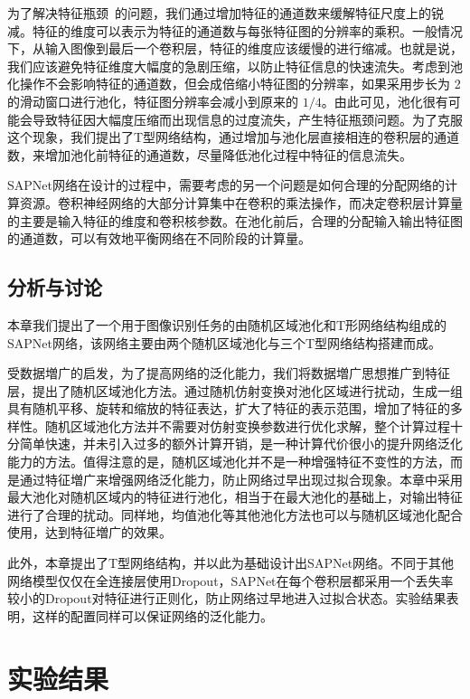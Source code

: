 为了解决特征瓶颈~\cite{szegedy2015rethinking}的问题，我们通过增加特征的通道数来缓解特征尺度上的锐减。特征的维度可以表示为特征的通道数与每张特征图的分辨率的乘积。一般情况下，从输入图像到最后一个卷积层，特征的维度应该缓慢的进行缩减。也就是说，我们应该避免特征维度大幅度的急剧压缩，以防止特征信息的快速流失。考虑到池化操作不会影响特征的通道数，但会成倍缩小特征图的分辨率，如果采用步长为 2 的滑动窗口进行池化，特征图分辨率会减小到原来的 $1/4$。由此可见，池化很有可能会导致特征因大幅度压缩而出现信息的过度流失，产生特征瓶颈问题。为了克服这个现象，我们提出了T型网络结构，通过增加与池化层直接相连的卷积层的通道数，来增加池化前特征的通道数，尽量降低池化过程中特征的信息流失。

SAPNet网络在设计的过程中，需要考虑的另一个问题是如何合理的分配网络的计算资源。卷积神经网络的大部分计算集中在卷积的乘法操作，而决定卷积层计算量的主要是输入特征的维度和卷积核参数。在池化前后，合理的分配输入输出特征图的通道数，可以有效地平衡网络在不同阶段的计算量。

\subsection{分析与讨论}
\label{sec:sap:model:discuss}

本章我们提出了一个用于图像识别任务的由随机区域池化和T形网络结构组成的SAPNet网络，该网络主要由两个随机区域池化与三个T型网络结构搭建而成。

受数据増广的启发，为了提高网络的泛化能力，我们将数据増广思想推广到特征层，提出了随机区域池化方法。通过随机仿射变换对池化区域进行扰动，生成一组具有随机平移、旋转和缩放的特征表达，扩大了特征的表示范围，增加了特征的多样性。随机区域池化方法并不需要对仿射变换参数进行优化求解，整个计算过程十分简单快速，并未引入过多的额外计算开销，是一种计算代价很小的提升网络泛化能力的方法。值得注意的是，随机区域池化并不是一种增强特征不变性的方法，而是通过特征増广来增强网络泛化能力，防止网络过早出现过拟合现象。本章中采用最大池化对随机区域内的特征进行池化，相当于在最大池化的基础上，对输出特征进行了合理的扰动。同样地，均值池化等其他池化方法也可以与随机区域池化配合使用，达到特征増广的效果。

此外，本章提出了T型网络结构，并以此为基础设计出SAPNet网络。不同于其他网络模型仅仅在全连接层使用Dropout，SAPNet在每个卷积层都采用一个丢失率较小的Dropout对特征进行正则化，防止网络过早地进入过拟合状态。实验结果表明，这样的配置同样可以保证网络的泛化能力。


\section{实验结果}
\label{sec:sap:experiment}

